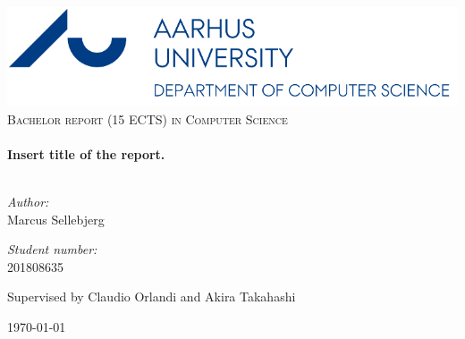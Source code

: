 \begin{titlepage}
\begin{center}

\includegraphics[width=1\textwidth]{img/AUlogo}\\[0.4cm]
\textsc{\Large Bachelor report (15 ECTS) in Computer Science}\\[0.5cm]
\vspace{10mm}
\HRule \\[0.4cm]
{ \huge \bfseries Insert title of the report. }\\[0.4cm]
\HRule \\[0.4cm]

\begin{minipage}{0.4\textwidth}
\begin{flushleft} \large
\emph{Author:}\\
Marcus Sellebjerg
\end{flushleft}
\end{minipage}
\begin{minipage}{0.4\textwidth}
\begin{flushright} \large
\emph{Student number:} \\
201808635
\end{flushright}
\end{minipage}
\vspace{10mm}
\begin{center}
    Supervised by Claudio Orlandi and Akira Takahashi
\end{center}
\vfill
{\large \today}
\end{center}
\end{titlepage}